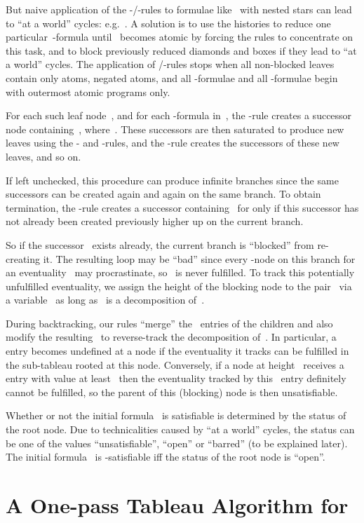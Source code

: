 \documentclass{entcs}
\newcommand{\pdl}{}
\newcommand{\fea}{}
\newcommand{\trea}{}
\begin{document}
But naive application of the -/-rules to
formulae like~
with nested stars can lead to ``at a world'' cycles: e.g.\
.
A solution is to use the histories to reduce one particular~-formula
until~ becomes atomic by forcing the rules to concentrate on
this task, and 
to block previously reduced diamonds and boxes
if they lead to ``at a world'' cycles.
The application of /-rules stops
when all non-blocked leaves contain only atoms, negated atoms,
and all \fea{}-formulae and all -formulae
begin with outermost atomic programs only.

For each such leaf node~, and for each -formula in~,
the \trea{}-rule creates a successor node containing~,
where~.
These successors are then saturated to produce new leaves
using the - and -rules,
and the \trea{}-rule creates the successors of these new leaves, and so on.

If left unchecked, this procedure can produce infinite branches
since the same successors can be created again and again on the same branch.
To obtain termination,
the \trea{}-rule creates a successor containing~ for 
only if 
this successor has not already been created previously higher up on the current branch.

So if the successor~ exists already,
the current branch is ``blocked'' from re-creating it.
The resulting loop may be ``bad'' since every -node
on this branch for an eventuality~ may procrastinate,
so~ is never fulfilled.
To track this potentially unfulfilled eventuality,
we assign the height of the blocking node to the pair~ 
via a variable~ as long as~ is a decomposition of~.

During backtracking, our rules ``merge'' the~ entries of the children
and also modify the resulting~
to reverse-track the decomposition of~.
In particular, a~ entry becomes undefined at a node
if the eventuality it tracks can be fulfilled in the sub-tableau rooted at this node.
Conversely, if a node at height~ receives a~ entry with value at least~
then the eventuality tracked by this~ entry definitely cannot be fulfilled,
so the parent of this (blocking) node is then unsatisfiable.

Whether or not the initial formula~ is satisfiable
is determined by the status of the root node.
Due to technicalities caused by ``at a world'' cycles,
the status can be one of the values ``unsatisfiable'', ``open'' or ``barred'' (to be explained later).
The initial formula~ is \pdl{}-satisfiable iff the status of the root node is ``open''.


\section{A One-pass Tableau Algorithm for \pdl{}}
\end{document}
